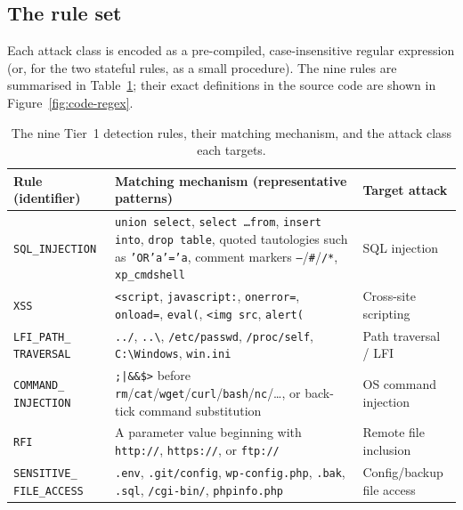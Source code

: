 \documentclass[12pt,a4paper]{report}
\begin{document}
\subsection{The rule set}

Each attack class is encoded as a pre-compiled, case-insensitive regular
expression (or, for the two stateful rules, as a small procedure). The nine
rules are summarised in Table~\ref{tab:rules}; their exact definitions in the
source code are shown in Figure~\ref{fig:code-regex}.

\begin{table}[ht]
  \centering
  \caption{The nine Tier~1 detection rules, their matching mechanism, and the
           attack class each targets.}
  \label{tab:rules}
  \renewcommand{\arraystretch}{1.3}
  \setlength{\tabcolsep}{5pt}
  \footnotesize
  \begin{tabular}{|p{3.2cm}|p{6.6cm}|p{2.6cm}|}
    \hline
    \textbf{Rule (identifier)} & \textbf{Matching mechanism (representative patterns)} & \textbf{Target attack} \\
    \hline
    \texttt{SQL\_INJECTION} & \texttt{union select}, \texttt{select \dots from}, \texttt{insert into}, \texttt{drop table}, quoted tautologies such as \texttt{'OR'a'='a}, comment markers \texttt{--}/\texttt{\#}/\texttt{/*}, \texttt{xp\_cmdshell} & SQL injection \\
    \hline
    \texttt{XSS} & \texttt{<script}, \texttt{javascript:}, \texttt{onerror=}, \texttt{onload=}, \texttt{eval(}, \texttt{<img src}, \texttt{alert(} & Cross-site scripting \\
    \hline
    \texttt{LFI\_PATH\_} \texttt{TRAVERSAL} & \texttt{../}, \texttt{..\textbackslash}, \texttt{/etc/passwd}, \texttt{/proc/self}, \texttt{C:\textbackslash Windows}, \texttt{win.ini} & Path traversal / LFI \\
    \hline
    \texttt{COMMAND\_} \texttt{INJECTION} & \texttt{;|\&\&\$>} before \texttt{rm}/\texttt{cat}/\texttt{wget}/\texttt{curl}/\texttt{bash}/\texttt{nc}/\dots, or back-tick command substitution & OS command injection \\
    \hline
    \texttt{RFI} & A parameter value beginning with \texttt{http://}, \texttt{https://}, or \texttt{ftp://} & Remote file inclusion \\
    \hline
    \texttt{SENSITIVE\_} \texttt{FILE\_ACCESS} & \texttt{.env}, \texttt{.git/config}, \texttt{wp-config.php}, \texttt{.bak}, \texttt{.sql}, \texttt{/cgi-bin/}, \texttt{phpinfo.php} & Config/backup file access \\

\end{tabular}
\end{table}
\end{document}
